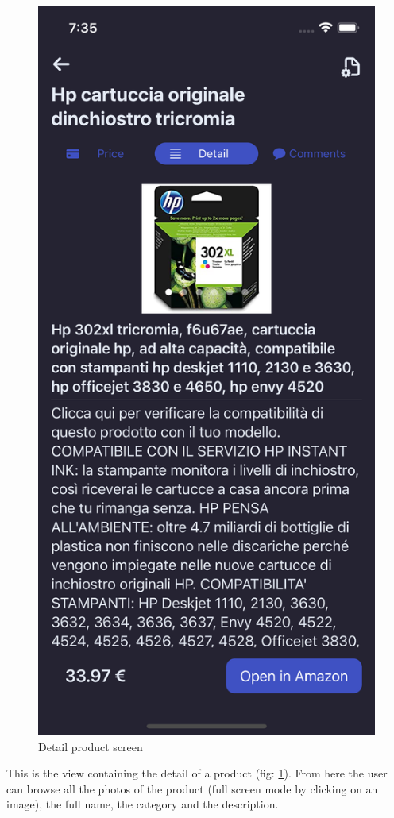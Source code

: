 \begin{figure}[h!]
        \centering
        \includegraphics[scale=0.15]{images/interfaces/detail_product_screen.png}
        \caption{Detail product screen}
        \label{fig:detail_product_screen}
\end{figure}
\FloatBarrier
This is the view containing the detail of a product (fig: \ref{fig:detail_product_screen}). From here the user can browse all the photos of the product (full screen mode by clicking on an image), the full name, the category and the description.\\\\

